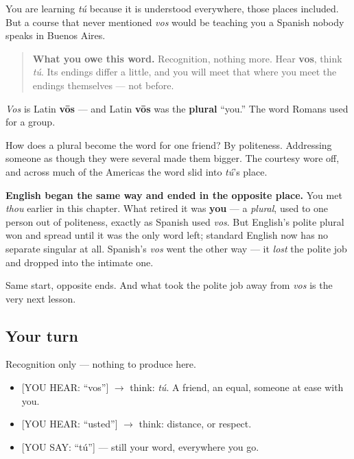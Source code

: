 You are learning \emph{tú} because it is understood everywhere, those places included. But a course that never mentioned \emph{vos} would be teaching you a Spanish nobody speaks in Buenos Aires.

\begin{quote}
\textbf{What you owe this word.} Recognition, nothing more. Hear \textbf{vos}, think \emph{tú}. Its endings differ a little, and you will meet that where you meet the endings themselves — not before.
\end{quote}

\begin{cousinweb}
\emph{Vos} is Latin \textbf{vōs} — and Latin \textbf{vōs} was the \textbf{plural} \textquotedblleft{}you.\textquotedblright{} The word Romans used for a group.

How does a plural become the word for one friend? By politeness. Addressing someone as though they were several made them bigger. The courtesy wore off, and across much of the Americas the word slid into \emph{tú}'s place.

\textbf{English began the same way and ended in the opposite place.} You met \emph{thou} earlier in this chapter. What retired it was \textbf{you} — a \emph{plural}, used to one person out of politeness, exactly as Spanish used \emph{vos}. But English's polite plural won and spread until it was the only word left; standard English now has no separate singular at all. Spanish's \emph{vos} went the other way — it \emph{lost} the polite job and dropped into the intimate one.

Same start, opposite ends. And what took the polite job away from \emph{vos} is the very next lesson.
\end{cousinweb}

\subsection*{Your turn}
Recognition only — nothing to produce here.

\begin{itemize}
\raggedright
  \item {[}YOU HEAR: \textquotedblleft{}vos\textquotedblright{}{]} $\to$ think: \emph{tú}. A friend, an equal, someone at ease with you.
  \item {[}YOU HEAR: \textquotedblleft{}usted\textquotedblright{}{]} $\to$ think: distance, or respect.
  \item {[}YOU SAY: \textquotedblleft{}tú\textquotedblright{}{]} — still your word, everywhere you go.
\end{itemize}

